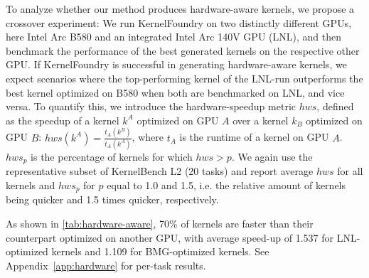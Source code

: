 To analyze whether our method produces hardware-aware kernels, we propose a crossover experiment: We run KernelFoundry on two distinctly different GPUs, here Intel Arc B580 and an integrated Intel Arc 140V GPU (LNL), and then benchmark the performance of the best generated kernels on the respective other GPU. If KernelFoundry is successful in generating hardware-aware kernels, we expect scenarios where the top-performing kernel of the LNL-run outperforms the best kernel optimized on B580 when both are benchmarked on LNL, 
and vice versa.
To quantify this, we introduce the hardware-speedup metric $hws$, defined as the speedup of a kernel $k^A$ optimized on GPU $A$ over a kernel $k_B$ optimized on GPU $B$: $hws(k^A) = \frac{t_{A} (k^B)}{t_A(k^A)}$, where $t_A$ is the runtime of a kernel on GPU $A$.  $hws_p$ is the percentage of kernels for which $hws > p $. We again use the representative subset of KernelBench L2 (20 tasks) and report average $hws$ for all kernels and $hws_p$ for $p$ equal to 1.0 and 1.5, i.e. the relative amount of kernels being quicker and 1.5 times quicker, respectively.  

\begin{table}[H]
\centering
{}
\caption{Evaluating hardware awareness. Kernels optimized for the target GPU outperform kernels optimized on another GPU.} 
\label{tab:hardware-aware}
\end{table}


As shown in \autoref{tab:hardware-aware}, 70\% of kernels are faster than their counterpart optimized on another GPU, with average speed-up of 1.537 for LNL-optimized kernels and 1.109 for BMG-optimized kernels. See Appendix~\ref{app:hardware} for per-task results.



